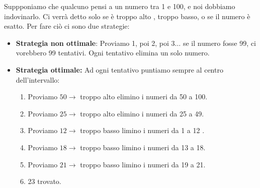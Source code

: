\begin{codeexample}
    Suppponiamo che qualcuno pensi a un numero tra 1 e 100, e noi dobbiamo indovinarlo. Ci verrà detto solo se è troppo alto , troppo basso, o se il numero è esatto.
    Per fare ciò ci sono due strategie:
    \begin{itemize}
    \item \textbf{Strategia  non ottimale}: Proviamo 1, poi 2, poi 3$\ldots$ se il numero fosse 99, ci vorebbero 99 tentativi. Ogni tentativo elimina un solo numero.
    \item \textbf{Strategia ottimale:} Ad ogni tentativo puntiamo sempre al centro dell'intervallo:
    \begin{enumerate}
        \item Proviamo $50 \rightarrow$ troppo alto elimino i numeri da 50 a 100.
        \item Proviamo $25 \rightarrow$ troppo alto elimino i numeri da 25 a 49.
        \item Proviamo $12 \rightarrow$ troppo basso limino i numeri da 1 a 12 .
        \item Proviamo $18 \rightarrow$ troppo basso limino i numeri da 13 a 18.
        \item Proviamo $21 \rightarrow$ troppo basso limino i numeri da 19 a 21.
        \item 23 trovato.
    \end{enumerate}
    \end{itemize}
    


    \begin{center}
\end{center}
\end{codeexample}
